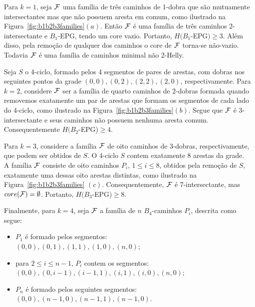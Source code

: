 Para $k=1$, seja $\cal{F}$ uma família de três caminhos de 1-dobra que são mutuamente intersectantes mas que não possuem aresta em comum, como ilustrado na Figura~\ref{fig:b1b2b3families}$(a)$. 
Então $\cal{F}$ é uma família de três caminhos  2-intersectante e $B_1$-EPG, tendo um core vazio. Portanto, $H(B_1$-EPG$) \geq 3$. 
Além disso, pela remoção de qualquer dos caminhos o core de $\cal{F}$ torna-se não-vazio. Todavia $\cal{F}$ é uma família de caminhos minimal não 2-Helly.

Seja $S$ o 4-ciclo, formado pelos 4 segmentos de pares de arestas, com dobras nos seguintes pontos da grade $(0,0),(0,2),(2,2),(2,0)$, respectivamente.
 Para $k= 2$,  considere $\cal{F}$ ser a família de quarto caminhos de 2-dobras formada quando removemos exatamente um par de arestas que formam os segmentos de cada lado do 4-ciclo, como ilustrado na  Figura~\ref{fig:b1b2b3families}$ (b)$.
Segue que $\cal{F}$ é 3-intersectante e seus caminhos não possuem nenhuma aresta comum. Consequentemente $H(B_2$-EPG)$ \geq 4$.

Para $k=3$, considere a família $\cal{F}$ de oito caminhos de  3-dobras, respectivamente, que podem ser obtidos de $S$. O 4-ciclo $S$ contem exatamente  8 arestas da grade. A  família $\cal{F}$ consiste de oito caminhos $P_i$, $1 \leq i \leq 8$, obtidos pela remoção de $S$, exatamente uma dessas oito arestas distintas, como ilustrado na Figura~\ref{fig:b1b2b3families} $ (c)$. Consequentemente, $\cal{F}$ é 7-intersectante, mas $core({\cal{F}}) = \emptyset$. Portanto, $H(B_3$-EPG)$\geq 8$.

Finalmente, para $k = 4$, seja $\cal{F}$ a família de $n$ $B_4$-caminhos $P_i$, descrita como segue:

\begin{itemize}
    \item $P_1$ é formado pelos segmentos: \\ $(0,0),(0,1),(1,1),(1,0),(n,0)$; 

     \item para $2 \leq i \leq n-1$, $P_i$ contem os segmentos: \\
     $(0,0),(0,i-1),(i-1,1),(i,1),(i,0),(n,0)$;
     
     \item  $P_n$ é formado pelos seguintes segmentos: \\ $(0,0),(n-1,0),(n-1,1),(n-1,0).$
     
\end{itemize}     

